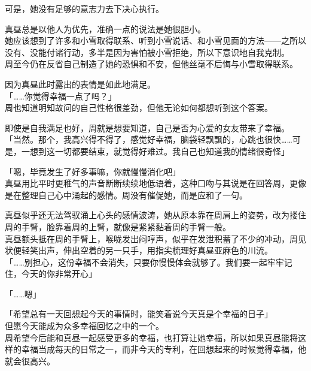 可是，她没有足够的意志力去下决心执行。

真昼总是以他人为优先，准确一点的说法是她很胆小。\\

她应该想到了许多和小雪取得联系、听到小雪说话、和小雪见面的方法——之所以没有、没能付诸行动，多半是因为害怕被小雪拒绝，所以下意识地自我克制。\\

周至今仍在反省自己制造了她的恐惧和不安，但他丝毫不后悔与小雪取得联系。

因为真昼此时露出的表情是如此地满足。\\

「……你觉得幸福一点了吗？」\\

周也知道明知故问的自己性格很差劲，但他无论如何都想听到这个答案。

即使是自我满足也好，周就是想要知道，自己是否为心爱的女友带来了幸福。\\

「当然。那个，我高兴得不得了，感觉好幸福，脑袋轻飘飘的，心跳也很快……可是，一想到这一切都要结束，就觉得好难过。我自己也知道我的情绪很奇怪」

「嗯，毕竟发生了好多事嘛，你就慢慢消化吧」\\

真昼用比平时更稚气的声音断断续续地低语着，这种口吻与其说是在回答周，更像是在整理自己心中涌起的感情。周没有催促她，而是应和了一句。

真昼似乎还无法驾驭涌上心头的感情波涛，她从原本靠在周肩上的姿势，改为搂住周的手臂，脸靠着周的上臂，就像是紧紧黏着周的手臂一般。\\

真昼额头抵在周的手臂上，喉咙发出闷哼声，似乎在发泄积蓄了不少的冲动，周见状便轻笑出声，伸出空着的另一只手，用指尖梳理好真昼亚麻色的川流。\\

「……别担心，这份幸福不会消失，只要你慢慢体会就够了。我们要一起牢牢记住，今天的你非常开心」

「……嗯」

「希望总有一天回想起今天的事情时，能笑着说今天真是个幸福的日子」\\

但愿今天能成为众多幸福回忆之中的一个。\\

周希望今后能和真昼一起感受更多的幸福，也打算让她幸福，所以如果真昼能将这样的幸福当成每天的日常之一，而非今天的专利，在回想起来的时候觉得幸福，他就会很高兴。\\

